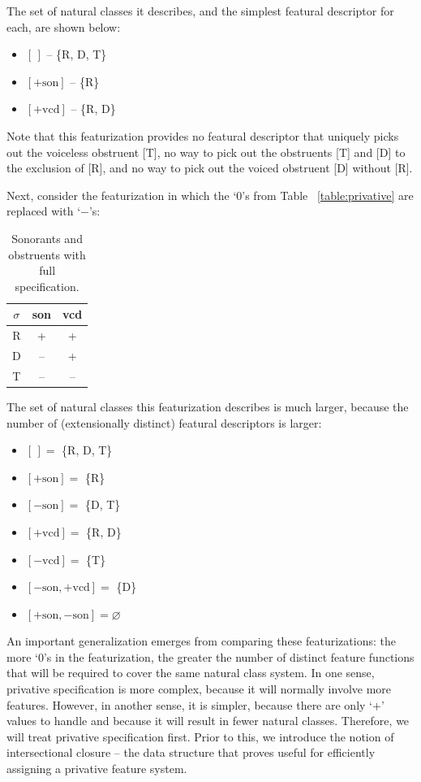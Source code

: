 \documentclass[11pt, oneside]{article}   	%
\begin{document}
\noindent The set of natural classes it describes, and the simplest featural descriptor for each, are shown below: \begin{itemize}
  \item $[\,]$ -- \{R, D, T\}
  \item $[+\text{son}]$ -- \{R\}
  \item $[+\text{vcd}]$ -- \{R, D\}
  \end{itemize}
  
\noindent Note that this featurization provides no featural descriptor that uniquely picks out the voiceless obstruent [T], no way to pick out the obstruents [T] and [D] to the exclusion of [R], and no way to pick out the voiced obstruent [D] without [R].

Next, consider the featurization in which the `$0$'s from Table ~\ref{table:privative} are replaced with `$-$'s:

\begin{table}[h]
    \centering
    \begin{tabular} {|c||c|c|}
    \hline
        $\sigma$ & son & vcd \\ \hline
        R & + & + \\
        D & -- & + \\
        T & -- & -- \\
        \hline
    \end{tabular}
    \caption{Sonorants and obstruents with full specification.}
    \label{table:full}
\end{table}

\noindent The set of natural classes this featurization describes is much larger, because the number of (extensionally distinct) featural descriptors is larger: \begin{itemize}
    \item $[\,] =$ \{R, D, T\}
    \item $[+\text{son}] =$ \{R\}
    \item $[-\text{son}] =$ \{D, T\}
    \item $[+\text{vcd}] =$ \{R, D\}
    \item $[-\text{vcd}] =$ \{T\}
    \item $[-\text{son},+\text{vcd}] =$ \{D\}
    \item $[+\text{son},-\text{son}] = \varnothing$
    \end{itemize}

\noindent An important generalization emerges from comparing these featurizations: the more `$0$'s in the featurization, the greater the number of distinct feature functions that will be required to cover the same natural class system. In one sense, privative specification is more complex, because it will normally involve more features. However, in another sense, it is simpler, because there are only `$+$' values to handle and because it will result in fewer natural classes. Therefore, we will treat privative specification first. Prior to this, we introduce the notion of intersectional closure -- the data structure that proves useful for efficiently assigning a privative feature system.
\end{document}
